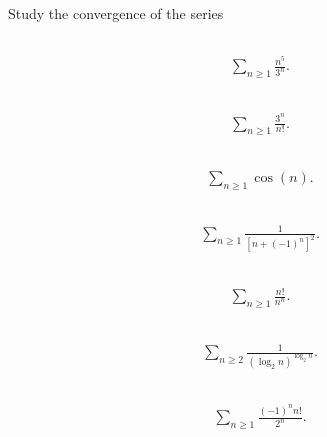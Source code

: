 \documentclass[11pt,letterpaper]{article}
\begin{document}
\section{}
Study the convergence of the series

\subsection{}
\begin{align}
    \sum_{n\geq 1}\frac{n^5}{3^n}.
\end{align}

\subsection{}
\begin{align}
    \sum_{n\geq 1}\frac{3^n}{n!}.
\end{align}

\subsection{}
\begin{align}
    \sum_{n\geq 1}\cos(n).
\end{align}

\subsection{}
\begin{align}
    \sum_{n\geq 1}\frac{1}{[n+(-1)^n]^2}.
\end{align}

\subsection{}
\begin{align}
    \sum_{n\geq 1}\frac{n!}{n^n}.
\end{align}

\subsection{}
\begin{align}
    \sum_{n\geq 2}\frac{1}{(\log_2 n)^{\log_2 n}}.
\end{align}

\subsection{}
\begin{align}
    \sum_{n\geq 1}\frac{(-1)^n n!}{2^n}.
\end{align}
\end{document}
